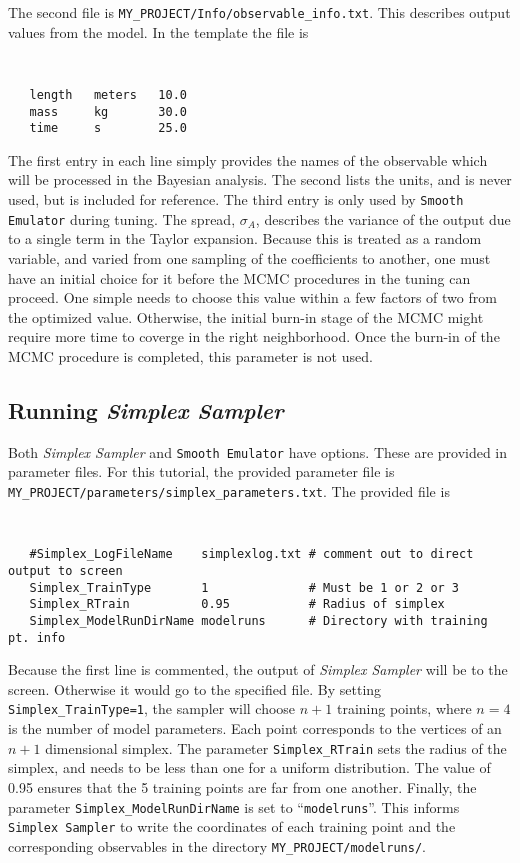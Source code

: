 \documentclass[UserManual.tex]{subfiles}
\begin{document}
The second file is {\tt MY\_PROJECT/Info/observable\_info.txt}. This describes output values from the model. In the template the file is
{\tt
\begin{verbatim}
   length   meters   10.0
   mass     kg       30.0
   time     s        25.0
\end{verbatim}
}
The first entry in each line simply provides the names of the observable which will be processed in the Bayesian analysis. The second lists the units, and is never used, but is included for reference. The third entry is only used by {\tt Smooth Emulator} during tuning. The spread, $\sigma_A$, describes the variance of the output due to a single term in the Taylor expansion. Because this is treated as a random variable, and varied from one sampling of the coefficients to another, one must have an initial choice for it before the MCMC procedures in the tuning can proceed. One simple needs to choose this value within a few factors of two from the optimized value. Otherwise, the initial burn-in stage of the MCMC might require more time to coverge in the right neighborhood. Once the burn-in of the MCMC procedure is completed, this parameter is not used. 

\subsection{Running {\it Simplex Sampler}}

Both {\it Simplex Sampler} and {\tt Smooth Emulator} have options. These are provided in parameter files. For this tutorial, the provided parameter file is {\tt MY\_PROJECT/parameters/simplex\_parameters.txt}. The provided file is
{\tt
\begin{verbatim}
   #Simplex_LogFileName    simplexlog.txt # comment out to direct output to screen
   Simplex_TrainType       1              # Must be 1 or 2 or 3               
   Simplex_RTrain          0.95           # Radius of simplex    
   Simplex_ModelRunDirName modelruns      # Directory with training pt. info
\end{verbatim}
}
Because the first line is commented, the output of {\it Simplex Sampler} will be to the screen. Otherwise it would go to the specified file. By setting {\tt Simplex\_TrainType=1}, the sampler will choose $n+1$ training points, where $n=4$ is the number of model parameters. Each point corresponds to the vertices of an $n+1$ dimensional simplex. The parameter {\tt Simplex\_RTrain} sets the radius of the simplex, and needs to be less than one for a uniform distribution. The value of 0.95 ensures that the 5 training points are far from one another. Finally, the parameter {\tt Simplex\_ModelRunDirName} is set to ``{\tt modelruns}''. This informs {\tt Simplex Sampler} to write the coordinates of each training point and the corresponding observables in the directory {\tt MY\_PROJECT/modelruns/}. 
\end{document}
